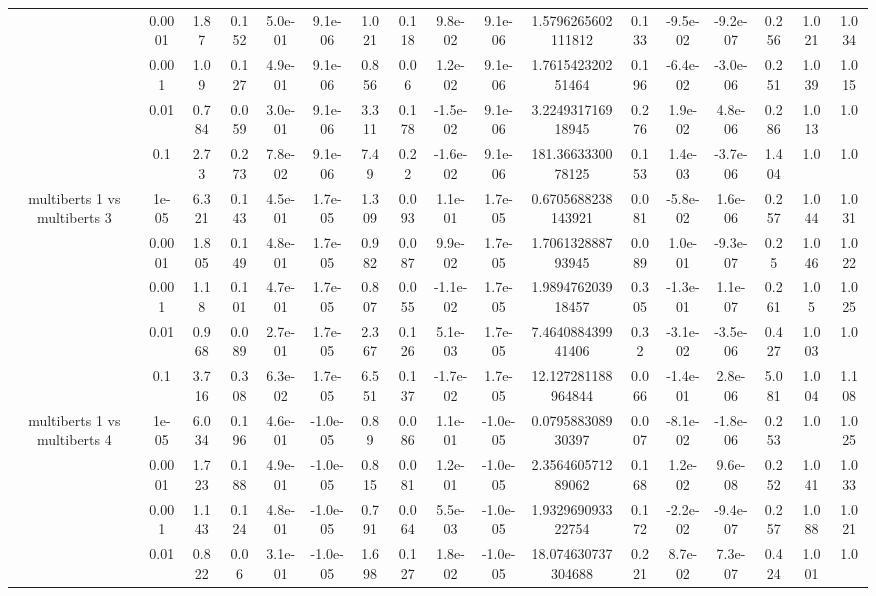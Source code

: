 \begin{tabular}{|c|c|c|c|c|c|c|c|c|c|c|c|c|c|c|c|c|}
 & 0.0001 & 1.87 & 0.152 & 5.0e-01 & 9.1e-06 & 1.021 & 0.118 & 9.8e-02 & 9.1e-06 & 1.5796265602111812 & 0.133 & -9.5e-02 & -9.2e-07 & 0.256 & 1.021 & 1.034 \\
 & 0.001 & 1.09 & 0.127 & 4.9e-01 & 9.1e-06 & 0.856 & 0.06 & 1.2e-02 & 9.1e-06 & 1.761542320251464 & 0.196 & -6.4e-02 & -3.0e-06 & 0.251 & 1.039 & 1.015 \\
 & 0.01 & 0.784 & 0.059 & 3.0e-01 & 9.1e-06 & 3.311 & 0.178 & -1.5e-02 & 9.1e-06 & 3.224931716918945 & 0.276 & 1.9e-02 & 4.8e-06 & 0.286 & 1.013 & 1.0 \\
 & 0.1 & 2.73 & 0.273 & 7.8e-02 & 9.1e-06 & 7.49 & 0.22 & -1.6e-02 & 9.1e-06 & 181.3663330078125 & 0.153 & 1.4e-03 & -3.7e-06 & 1.404 & 1.0 & 1.0 \\
\hline
\multirow{5}{*}{multiberts 1 vs multiberts 3} & 1e-05 & 6.321 & 0.143 & 4.5e-01 & 1.7e-05 & 1.309 & 0.093 & 1.1e-01 & 1.7e-05 & 0.6705688238143921 & 0.081 & -5.8e-02 & 1.6e-06 & 0.257 & 1.044 & 1.031 \\
 & 0.0001 & 1.805 & 0.149 & 4.8e-01 & 1.7e-05 & 0.982 & 0.087 & 9.9e-02 & 1.7e-05 & 1.706132888793945 & 0.089 & 1.0e-01 & -9.3e-07 & 0.25 & 1.046 & 1.022 \\
 & 0.001 & 1.18 & 0.101 & 4.7e-01 & 1.7e-05 & 0.807 & 0.055 & -1.1e-02 & 1.7e-05 & 1.989476203918457 & 0.305 & -1.3e-01 & 1.1e-07 & 0.261 & 1.05 & 1.025 \\
 & 0.01 & 0.968 & 0.089 & 2.7e-01 & 1.7e-05 & 2.367 & 0.126 & 5.1e-03 & 1.7e-05 & 7.464088439941406 & 0.32 & -3.1e-02 & -3.5e-06 & 0.427 & 1.003 & 1.0 \\
 & 0.1 & 3.716 & 0.308 & 6.3e-02 & 1.7e-05 & 6.551 & 0.137 & -1.7e-02 & 1.7e-05 & 12.127281188964844 & 0.066 & -1.4e-01 & 2.8e-06 & 5.081 & 1.004 & 1.108 \\
\hline
\multirow{5}{*}{multiberts 1 vs multiberts 4} & 1e-05 & 6.034 & 0.196 & 4.6e-01 & -1.0e-05 & 0.89 & 0.086 & 1.1e-01 & -1.0e-05 & 0.079588308930397 & 0.007 & -8.1e-02 & -1.8e-06 & 0.253 & 1.0 & 1.025 \\
 & 0.0001 & 1.723 & 0.188 & 4.9e-01 & -1.0e-05 & 0.815 & 0.081 & 1.2e-01 & -1.0e-05 & 2.356460571289062 & 0.168 & 1.2e-02 & 9.6e-08 & 0.252 & 1.041 & 1.033 \\
 & 0.001 & 1.143 & 0.124 & 4.8e-01 & -1.0e-05 & 0.791 & 0.064 & 5.5e-03 & -1.0e-05 & 1.932969093322754 & 0.172 & -2.2e-02 & -9.4e-07 & 0.257 & 1.088 & 1.021 \\
 & 0.01 & 0.822 & 0.06 & 3.1e-01 & -1.0e-05 & 1.698 & 0.127 & 1.8e-02 & -1.0e-05 & 18.074630737304688 & 0.221 & 8.7e-02 & 7.3e-07 & 0.424 & 1.001 & 1.0 \\

\end{tabular}
